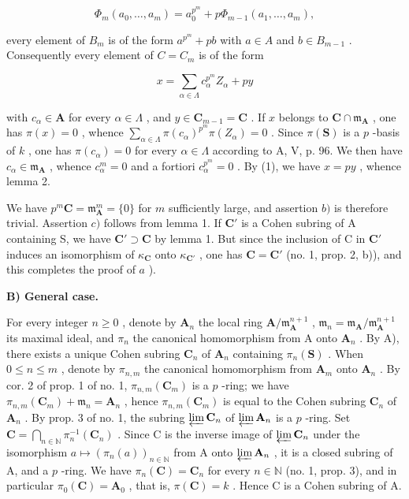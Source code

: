 \[
\Phi_ {m} (a _ {0}, \dots , a _ {m}) = a _ {0} ^ {p ^ {m}} + p \Phi_ {m - 1} (a _ {1}, \dots , a _ {m}),
\]

every element of \(B_{m}\) is of the form \(a^{p^{m}} + pb\) with \(a \in A\) and \(b \in B_{m-1}\) . Consequently every element of \(C = C_{m}\) is of the form

\[
x = \sum_ {\alpha \in \Lambda} c _ {\alpha} ^ {p ^ {m}} Z _ {\alpha} + p y\tag{1}
\]

with \(c_{\alpha} \in \mathbf{A}\) for every \(\alpha \in \Lambda\) , and \(y \in \mathbf{C}_{m-1} = \mathbf{C}\) . If \(x\) belongs to \(\mathbf{C} \cap \mathfrak{m}_{\mathbf{A}}\) , one has \(\pi(x) = 0\) , whence \(\sum_{\alpha \in \Lambda} \pi(c_{\alpha})^{p^m} \pi(Z_{\alpha}) = 0\) . Since \(\pi(\mathbf{S})\) is a \(p\) -basis of \(k\) , one has \(\pi(c_{\alpha}) = 0\) for every \(\alpha \in \Lambda\) according to A, V, p. 96. We then have \(c_{\alpha} \in \mathfrak{m}_{\mathbf{A}}\) , whence \(c_{\alpha}^m = 0\) and a fortiori \(c_{\alpha}^{p^m} = 0\) . By (1), we have \(x = py\) , whence lemma 2.

We have \(p^m\mathbf{C} = \mathfrak{m}_{\mathbf{A}}^m = \{0\}\) for \(m\) sufficiently large, and assertion \(b)\) is therefore trivial. Assertion \(c)\) follows from lemma 1. If \(\mathbf{C}'\) is a Cohen subring of A containing S, we have \(\mathbf{C}' \supset \mathbf{C}\) by lemma 1. But since the inclusion of C in \(\mathbf{C}'\) induces an isomorphism of \(\kappa_{\mathbf{C}}\) onto \(\kappa_{\mathbf{C}'}\) , one has \(\mathbf{C} = \mathbf{C}'\) (no. 1, prop. 2, b)), and this completes the proof of \(a\) ).

\noindent\textbf{B) General case.}\par

For every integer \(n \geqslant 0\) , denote by \(\mathbf{A}_n\) the local ring \(\mathbf{A}/\mathfrak{m}_{\mathbf{A}}^{n+1}\) , \(\mathfrak{m}_n = \mathfrak{m}_{\mathbf{A}}/\mathfrak{m}_{\mathbf{A}}^{n+1}\) its maximal ideal, and \(\pi_n\) the canonical homomorphism from A onto \(\mathbf{A}_n\) . By A), there exists a unique Cohen subring \(\mathbf{C}_n\) of \(\mathbf{A}_n\) containing \(\pi_n(\mathbf{S})\) . When \(0 \leqslant n \leqslant m\) , denote by \(\pi_{n,m}\) the canonical homomorphism from \(\mathbf{A}_m\) onto \(\mathbf{A}_n\) . By cor. 2 of prop. 1 of no. 1, \(\pi_{n,m}(\mathbf{C}_m)\) is a \(p\) -ring; we have \(\pi_{n,m}(\mathbf{C}_m) + \mathfrak{m}_n = \mathbf{A}_n\) , hence \(\pi_{n,m}(\mathbf{C}_m)\) is equal to the Cohen subring \(\mathbf{C}_n\) of \(\mathbf{A}_n\) . By prop. 3 of no. 1, the subring \(\varprojlim \mathbf{C}_n\) of \(\varprojlim \mathbf{A}_n\) is a \(p\) -ring. Set \(\mathbf{C} = \bigcap_{n \in \mathbb{N}} \pi_n^{-1}(\mathbf{C}_n)\) . Since C is the inverse image of \(\varprojlim \mathbf{C}_n\) under the isomorphism \(a \mapsto (\pi_n(a))_{n \in \mathbb{N}}\) from A onto \(\varprojlim \mathbf{A}_n\) , it is a closed subring of A, and a \(p\) -ring. We have \(\pi_n(\mathbf{C}) = \mathbf{C}_n\) for every \(n \in \mathbb{N}\) (no. 1, prop. 3), and in particular \(\pi_0(\mathbf{C}) = \mathbf{A}_0\) , that is, \(\pi(\mathbf{C}) = k\) . Hence C is a Cohen subring of A.

